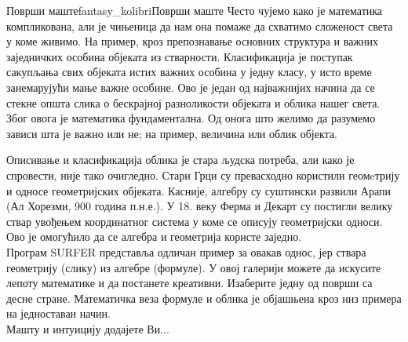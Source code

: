 \begin{surferIntroPage}{Површи маште}{fantasy_kolibri}{Површи маште}
Често чујемо како је математика компликована, али је чињеница да нам она помаже да схватимо сложеност света у коме живимо. На пример, кроз препознавање основних структура и важних заједничких особина објеката из стварности. Класификација је поступак сакупљања свих објеката истих важних особина у једну класу, у исто време занемарујући мање важне особине. Ово је један од најважнијих начина да се стекне општа слика о бескрајној разноликости објеката и облика нашег света. Због овога је математика фундаментална. Од онога што желимо да разумемо зависи шта је важно или не; на пример, величина или облик објекта.
\\

\vspace{0.4cm}

Описивање и класификација облика је стара људска потреба, али како је спровести, није тако очигледно. Стари Грци су превасходно користили геомeтрију и односе геометријских објеката. Касније, алгебру су суштински развили Арапи (Ал Хорезми, 900 година п.н.е.). У 18. веку Ферма и Декарт су постигли велику ствар увођењем координатног система у коме се описују геометријски односи. Ово је омогућило да се алгебра и геометрија користе заједно.
\\
\vspace{0.4cm}
Програм SURFER представља одличан пример за овакав однос, јер ствара геометрију (слику) из алгебре (формуле).
У овој галерији можете да искусите лепоту математике и да постанете креативни. Изаберите једну од површи са десне стране. Математичка веза формуле и облика је објашњена кроз низ примера на једноставан начин.\\
Машту и интуицију додајете Ви...
\end{surferIntroPage}
